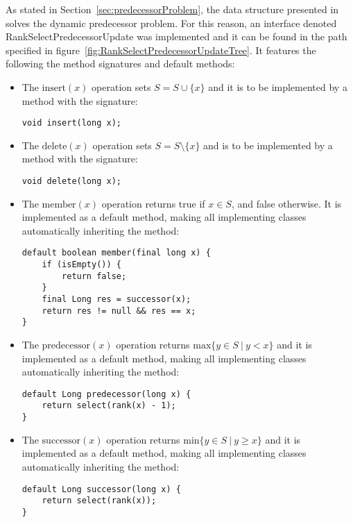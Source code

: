 As stated in Section~\ref{sec:predecessorProblem}, the data structure presented in \cite{patrascu2014dynamic} solves the dynamic predecessor problem.
For this reason, an interface denoted {\ttfamily RankSelectPredecessorUpdate} was implemented and it can be found in the path specified in figure~\ref{fig:RankSelectPredecessorUpdateTree}. It features the following the method signatures and default methods:
\begin{itemize}
    \item
    The $\text{insert}(x)$ operation sets $S=S \cup \{x\}$ and it is to be implemented by a method with the signature:
    \begin{lstlisting}
void insert(long x);
    \end{lstlisting}
    
    \item
    The $\text{delete}(x)$ operation sets $S=S \setminus \{x\}$ and is to be implemented by a method with the signature:
    \begin{lstlisting}
void delete(long x);
    \end{lstlisting}
    
    \item
    The $\text{member}(x)$ operation returns {\ttfamily true} if $x \in S$, and {\ttfamily false} otherwise. It is implemented as a default method, making all implementing classes automatically inheriting the method:
    \begin{lstlisting}
default boolean member(final long x) {
    if (isEmpty()) {
        return false;
    }
    final Long res = successor(x);
    return res != null && res == x;
}
    \end{lstlisting}

    \item
    The $\text{predecessor}(x)$ operation returns $\text{max}\{y\in S\ |\ y < x\}$ and it is implemented as a default method, making all implementing classes automatically inheriting the method:
    \begin{lstlisting}
default Long predecessor(long x) {
    return select(rank(x) - 1);
}
    \end{lstlisting}

    \item
    The $\text{successor}(x)$ operation returns $\text{min}\{y\in S\ |\ y \geq x\}$ and it is implemented as a default method, making all implementing classes automatically inheriting the method:
    \begin{lstlisting}
default Long successor(long x) {
    return select(rank(x));
}
    \end{lstlisting}


\end{itemize}
